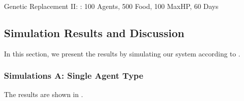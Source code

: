 Genetic Replacement II: : 100 Agents, 500 Food, 100 MaxHP, 60 Days



\subsection{Simulation Results and Discussion}

In this section, we present the results by simulating our system according to .


\subsubsection{Simulations A: Single Agent Type}

 The results are shown in .

